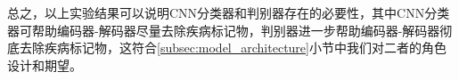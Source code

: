 总之，以上实验结果可以说明CNN分类器和判别器存在的必要性，其中CNN分类器可帮助编码器-解码器尽量去除疾病标记物，判别器进一步帮助编码器-解码器彻底去除疾病标记物，这符合\ref{subsec:model_architecture}小节中我们对二者的角色设计和期望。

